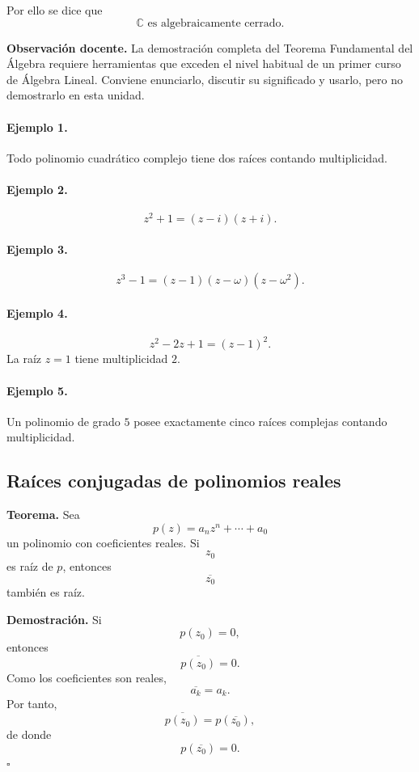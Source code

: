 Por ello se dice que
\[
\boxed{
\mathbb{C}\text{ es algebraicamente cerrado}.
}
\]

\textbf{Observación docente.}
La demostración completa del Teorema Fundamental del Álgebra requiere
herramientas que exceden el nivel habitual de un primer curso de Álgebra
Lineal. Conviene enunciarlo, discutir su significado y usarlo, pero no
demostrarlo en esta unidad.

\paragraph{Ejemplo 1.}
Todo polinomio cuadrático complejo tiene dos raíces contando multiplicidad.

\paragraph{Ejemplo 2.}
\[
z^2+1
=
(z-i)(z+i).
\]

\paragraph{Ejemplo 3.}
\[
z^3-1
=
(z-1)(z-\omega)(z-\omega^2).
\]

\paragraph{Ejemplo 4.}
\[
z^2-2z+1
=
(z-1)^2.
\]
La raíz $z=1$ tiene multiplicidad $2$.

\paragraph{Ejemplo 5.}
Un polinomio de grado $5$ posee exactamente cinco raíces complejas contando
multiplicidad.

\subsection{Raíces conjugadas de polinomios reales}

\textbf{Teorema.}
Sea
\[
p(z)=a_nz^n+\cdots+a_0
\]
un polinomio con coeficientes reales. Si
\[
z_0
\]
es raíz de $p$, entonces
\[
\overline{z_0}
\]
también es raíz.

\textbf{Demostración.}
Si
\[
p(z_0)=0,
\]
entonces
\[
\overline{p(z_0)}=0.
\]
Como los coeficientes son reales,
\[
\overline{a_k}=a_k.
\]
Por tanto,
\[
\overline{p(z_0)}
=
p(\overline{z_0}),
\]
de donde
\[
p(\overline{z_0})=0.
\]
\hfill$\square$

